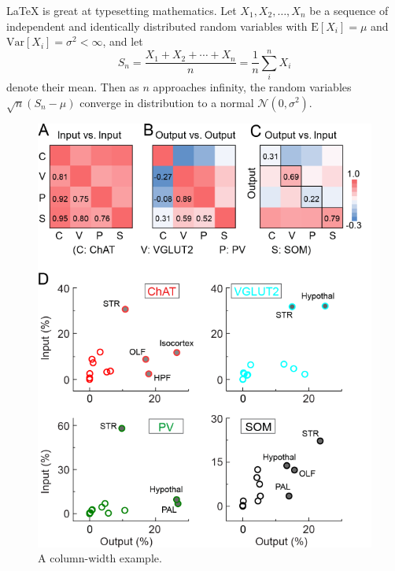 \documentclass[9pt,bestpractices]{livecoms}
\begin{document}
\LaTeX{} is great at typesetting mathematics. Let $X_1, X_2, \ldots, X_n$ be a sequence of independent and identically distributed random variables with $\text{E}[X_i] = \mu$ and $\text{Var}[X_i] = \sigma^2 < \infty$, and let
\begin{equation}
\label{eq:CLT}
S_n = \frac{X_1 + X_2 + \cdots + X_n}{n}
      = \frac{1}{n}\sum_{i}^{n} X_i
\end{equation}
denote their mean. Then as $n$ approaches infinity, the random variables $\sqrt{n}(S_n - \mu)$ converge in distribution to a normal $\mathcal{N}(0, \sigma^2)$.

\lipsum[3]

\begin{figure}[hbt!]
\includegraphics[width=\linewidth]{elife-13214-fig7}
\caption{A column-width example.}
\label{fig:view}

\end{figure}
\end{document}
